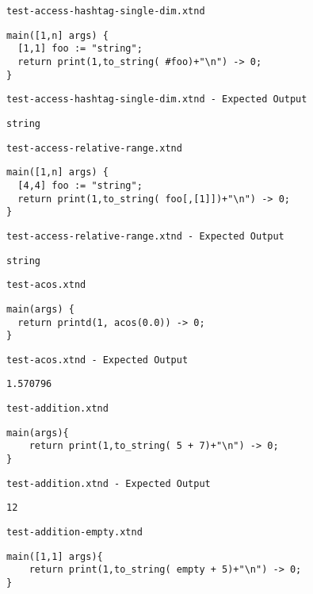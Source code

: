 \medskip \noindent \texttt{test-access-hashtag-single-dim.xtnd}


\begin{lstlisting}
main([1,n] args) {
  [1,1] foo := "string";
  return print(1,to_string( #foo)+"\n") -> 0;
}
\end{lstlisting}


\medskip \noindent \texttt{test-access-hashtag-single-dim.xtnd - Expected Output}


\begin{lstlisting}
string
\end{lstlisting}


\medskip \noindent \texttt{test-access-relative-range.xtnd}


\begin{lstlisting}
main([1,n] args) {
  [4,4] foo := "string";
  return print(1,to_string( foo[,[1]])+"\n") -> 0;
}
\end{lstlisting}


\medskip \noindent \texttt{test-access-relative-range.xtnd - Expected Output}


\begin{lstlisting}
string
\end{lstlisting}


\medskip \noindent \texttt{test-acos.xtnd}


\begin{lstlisting}
main(args) {
  return printd(1, acos(0.0)) -> 0;
}
\end{lstlisting}


\medskip \noindent \texttt{test-acos.xtnd - Expected Output}


\begin{lstlisting}
1.570796
\end{lstlisting}


\medskip \noindent \texttt{test-addition.xtnd}


\begin{lstlisting}
main(args){
	return print(1,to_string( 5 + 7)+"\n") -> 0;
}
\end{lstlisting}


\medskip \noindent \texttt{test-addition.xtnd - Expected Output}


\begin{lstlisting}
12
\end{lstlisting}


\medskip \noindent \texttt{test-addition-empty.xtnd}


\begin{lstlisting}
main([1,1] args){
	return print(1,to_string( empty + 5)+"\n") -> 0;
}
\end{lstlisting}


